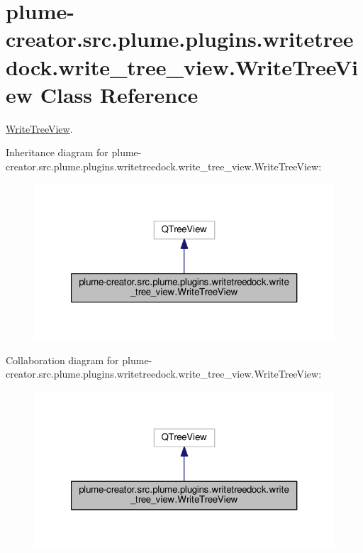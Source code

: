 \hypertarget{classplume-creator_1_1src_1_1plume_1_1plugins_1_1writetreedock_1_1write__tree__view_1_1_write_tree_view}{}\section{plume-\/creator.src.\+plume.\+plugins.\+writetreedock.\+write\+\_\+tree\+\_\+view.\+Write\+Tree\+View Class Reference}
\label{classplume-creator_1_1src_1_1plume_1_1plugins_1_1writetreedock_1_1write__tree__view_1_1_write_tree_view}


\hyperlink{classplume-creator_1_1src_1_1plume_1_1plugins_1_1writetreedock_1_1write__tree__view_1_1_write_tree_view}{Write\+Tree\+View}.  




Inheritance diagram for plume-\/creator.src.\+plume.\+plugins.\+writetreedock.\+write\+\_\+tree\+\_\+view.\+Write\+Tree\+View\+:\nopagebreak
\begin{figure}[H]
\begin{center}
\leavevmode
\includegraphics[width=321pt]{classplume-creator_1_1src_1_1plume_1_1plugins_1_1writetreedock_1_1write__tree__view_1_1_write_tree_view__inherit__graph}
\end{center}
\end{figure}


Collaboration diagram for plume-\/creator.src.\+plume.\+plugins.\+writetreedock.\+write\+\_\+tree\+\_\+view.\+Write\+Tree\+View\+:\nopagebreak
\begin{figure}[H]
\begin{center}
\leavevmode
\includegraphics[width=321pt]{classplume-creator_1_1src_1_1plume_1_1plugins_1_1writetreedock_1_1write__tree__view_1_1_write_tree_view__coll__graph}
\end{center}
\end{figure}
